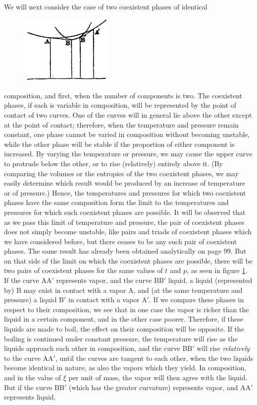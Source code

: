 \documentclass[12pt]{article}
\begin{document}
We will next consider the case of two coexistent phases of identical \begin{figure} %
    \centering
    \includegraphics[width=0.4\textwidth]{fig_6}
    \caption{ }
    \label{fig_6}
\end{figure}
composition, and first, when the number of components is two. The coexistent phases, if each is variable in composition, will be represented by the point of contact of two curves. One of the curves will in general lie above the other except at the point of contact; therefore, when the temperature and pressure remain constant, one phase cannot be varied in composition without becoming unstable, while the other phase will be stable if the proportion of either component is increased. By varying the temperature or pressure, we may cause the upper curve to protrude below the other, or to rise (relatively) entirely above it. (By comparing the volumes or the entropies of the two coexistent phases, we may easily determine which result would be produced by an increase of temperature or of pressure.) Hence, the temperatures and pressures for which two coexistent phases have the same composition form the limit to the temperatures and pressures for which such coexistent phases are possible. It will be observed that as we pass this limit of temperature and pressure, the pair of coexistent phases does not simply become unstable, like pairs and triads of coexistent phases which we have considered before, but there ceases to be any such pair of coexistent phases. The same result has already been obtained analytically on page 99. But on that side of the limit on which the coexistent phases are possible, there will be two pairs of coexistent phases for the same values of $t$ and $p$, as seen in figure \ref{fig_6}. If the curve AA$'$ represents vapor, and the curve BB$'$ liquid, a liquid (represented by) B may exist in contact with a vapor A, and (at the same temperature and pressure) a liquid B$'$ in contact with a vapor A$'$. If we compare these phases in respect to their composition, we see that in one case the vapor is richer than the liquid in a certain component, and in the other case poorer. Therefore, if these liquids are made to boil, the effect on their composition will be opposite. If the boiling is continued under constant pressure, the temperature will rise as the liquids approach each other in composition, and the curve BB$'$ will rise \textit{relatively} to the curve AA$'$, until the curves are tangent to each other, when the two liquids become identical in nature, as also the vapors which they yield. In composition, and in the value of $\xi$ per unit of mass, the vapor will then agree with the liquid. But if the curve BB$'$ (which has the greater curvature) represents vapor, and AA$'$ represents liquid, 
\end{document}
